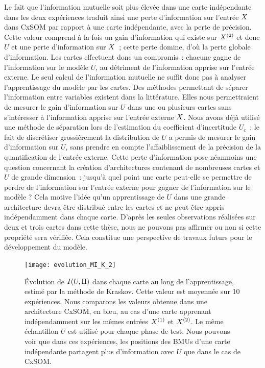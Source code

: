 \documentclass[../main]{subfiles}
\begin{document}
Le fait que l'information mutuelle soit plus élevée dans une carte indépendante dans les deux expériences traduit ainsi une perte d'information sur l'entrée $X$ dans CxSOM par rapport à une carte indépendante, avec la perte de précision. 
Cette valeur comprend à la fois un gain d'information qui existe sur $X^{({2})}$ et donc $U$ et une perte d'information sur $X$~; cette perte domine, d'où la perte globale d'information.
Les cartes effectuent donc un compromis~: chacune gagne de l'information sur le modèle $U$, au détriment de l'information apprise sur l'entrée externe.
Le seul calcul de l'information mutuelle ne suffit donc pas à analyser l'apprentissage du modèle par les cartes.
Des méthodes permettant de séparer l'information entre variables existent dans la littérature. Elles nous permettraient de mesurer le gain d'information sur $U$ dans une ou plusieurs cartes sans s'intéresser à l'information apprise sur l'entrée externe $X$.
Nous avons déjà utilisé une méthode de séparation lors de l'estimation du coefficient d'incertitude $U_c$~: le fait de discrétiser grossièrement la distribution de $U$ a permis de mesurer le gain d'information sur $U$, sans prendre en compte l'affaiblissement de la précision de la quantification de l'entrée externe.
Cette perte d'information pose néanmoins une question concernant la création d'architectures contenant de nombreuses cartes et $U$ de grande dimension~: jusqu'à quel point une carte peut-elle se permettre de perdre de l'information sur l'entrée externe pour gagner de l'information sur le modèle ? 
Cela motive l'idée qu'un apprentissage de $U$ dans une grande architecture devra être distribué entre les cartes et ne peut être appris indépendamment dans chaque carte. D'après les seules observations réalisées sur deux et trois cartes dans cette thèse, nous ne pouvons pas affirmer ou non si cette propriété sera vérifiée. Cela constitue une perspective de travaux futurs pour le développement du modèle.

\begin{figure}
\centering\texttt{[image: evolution\_MI\_K\_2]}
\caption{\'Evolution de $I(U,\Pi)$ dans chaque carte au long de l'apprentissage, estimé par la méthode de Kraskov.
Cette valeur est moyennée sur 10 expériences. Nous comparons les valeurs obtenue dans une architecture CxSOM, en bleu, au cas d'une carte apprenant indépendamment sur les mêmes entrées $X^{({1})}$ et $X^{({2})}$.
Le même échantillon $U$ est utilisé pour chaque phase de test.
Nous pouvons voir que dans ces expériences, les positions des BMUs d'une carte indépendante partagent plus d'information avec $U$ que dans le cas de CxSOM. 
\label{fig:MI_evol_total}}
\end{figure}
\end{document}
